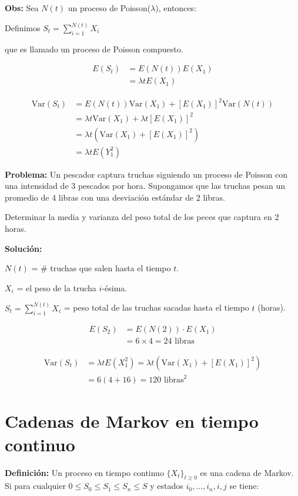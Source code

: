 \documentclass[12pt]{article}
\begin{document}
\textbf{Obs:} Sea $N(t)$ un proceso de Poisson($\lambda$), entonces:

Definimos $S_t = \sum_{i=1}^{N(t)} X_i$

que es llamado un proceso de Poisson compuesto.

\begin{align*}
E(S_t) &= E(N(t)) E(X_1) \\
&= \lambda t E(X_1)
\end{align*}

\begin{align*}
\text{Var}(S_t) &= E(N(t))\text{Var}(X_1) + [E(X_1)]^2\text{Var}(N(t)) \\
&= \lambda t \text{Var}(X_1) + \lambda t [E(X_1)]^2 \\
&= \lambda t \left(\text{Var}(X_1) + [E(X_1)]^2\right) \\
&= \lambda t E(Y_1^2)
\end{align*}

\textbf{Problema:} Un pescador captura truchas siguiendo un proceso de Poisson con una intensidad de 3 pescados por hora. Supongamos que las truchas pesan un promedio de 4 libras con una desviación estándar de 2 libras.

Determinar la media y varianza del peso total de los peces que captura en 2 horas.

\textbf{Solución:}

$N(t)$ = \# truchas que salen hasta el tiempo $t$.

$X_i$ = el peso de la trucha $i$-ésima.

$S_t = \sum_{i=1}^{N(t)} X_i$ = peso total de las truchas sacadas hasta el tiempo $t$ (horas).

\begin{align*}
E(S_2) &= E(N(2)) \cdot E(X_1) \\
&= 6 \times 4 = 24 \text{ libras}
\end{align*}

\begin{align*}
\text{Var}(S_t) &= \lambda t E(X_1^2) = \lambda t \left(\text{Var}(X_1) + [E(X_1)]^2\right) \\
&= 6(4 + 16) = 120 \text{ libras}^2
\end{align*}

\section*{Cadenas de Markov en tiempo continuo}

\textbf{Definición:} Un proceso en tiempo continuo $\{X_t\}_{t \geq 0}$ es una cadena de Markov. Si para cualquier $0 \leq S_0 \leq S_1 \leq S_n \leq S$ y estados $i_0, \ldots, i_n, i, j$ se tiene:
\end{document}
